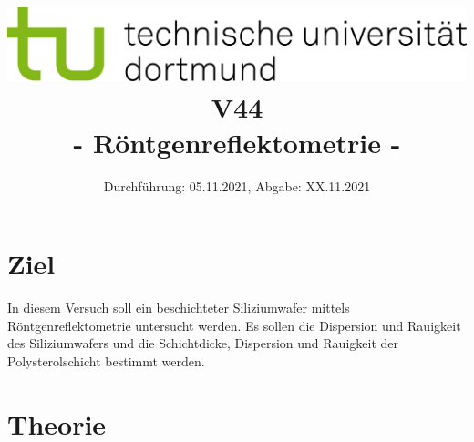 
\usepackage{romannum}
\usepackage{listings}
\lstset{numbers=left, numberstyle=\tiny, numbersep=5pt}
\lstset{language=Perl}

\title{\includegraphics[scale=0.8]{../logo.jpg} \\ \vspace*{1cm} V44 \\ - Röntgenreflektometrie -}

\date{Durchführung: 05.11.2021, Abgabe: XX.11.2021}



\maketitle

\tableofcontents
\newpage

\section{Ziel}
In diesem Versuch soll ein beschichteter Siliziumwafer mittels Röntgenreflektometrie untersucht werden. 
Es sollen die Dispersion und Rauigkeit des Siliziumwafers und die Schichtdicke, 
Dispersion und Rauigkeit der Polysterolschicht bestimmt werden.

\section{Theorie}
\label{sec:theorie}

